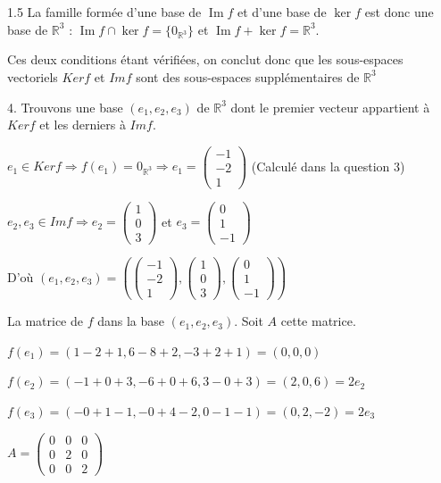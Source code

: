 \documentclass[12pt]{article}
\begin{document}
\begin{spacing}{1.5}
La famille formée d'une base de $\operatorname{Im}f$ et d'une base de $\ker f$ est donc une base de $\mathbb{R}^3$ : $\operatorname{Im}f\cap\ker f=\{0_{\mathbb{R}^3}\}$ et $\operatorname{Im}f+\ker f=\mathbb{R}^3$.

\medskip
Ces deux conditions étant vérifiées, on conclut donc que les sous-espaces vectoriels $Kerf$ et $Imf$ sont des sous-espaces supplémentaires de $\mathbb{R}^3$


4. Trouvons une base $(e_1,e_2,e_3)$ de $\mathbb{R}^3$ dont le premier vecteur appartient à $Kerf$ et les derniers à $Imf$. 

$e_1\in Kerf\Rightarrow f(e_1)=0_{\mathbb{R}^3}\Longrightarrow e_1=\begin{pmatrix}
-1\\
-2\\
1
\end{pmatrix}$ (Calculé dans la question 3)

$e_2,e_3\in Imf \Longrightarrow e_2=\begin{pmatrix}
1\\
0\\
3
\end{pmatrix}$ et $e_3=\begin{pmatrix}
0 \\
1 \\
-1
\end{pmatrix}$

D'où $(e_1,e_2,e_3)=(\begin{pmatrix}
-1\\
-2\\
1
\end{pmatrix},\begin{pmatrix}
1\\
0\\
3
\end{pmatrix},\begin{pmatrix}
0 \\
1 \\
-1
\end{pmatrix})$

\medskip
La matrice de $f$ dans la base $(e_1,e_2,e_3)$. Soit 	$A$ cette matrice.

$f(e_1)=(1-2+1,6-8+2,-3+2+1)=(0,0,0)$

$f(e_2)=(-1+0+3,-6+0+6,3-0+3)=(2,0,6)=2e_2$

$f(e_3)=(-0+1-1,-0+4-2,0-1-1)=(0,2,-2)=2e_3$

$A=\begin{pmatrix}
0 & 0 & 0 \\ 
0 & 2 & 0 \\ 
0 & 0 & 2
\end{pmatrix} $



\end{spacing}
\end{document}
